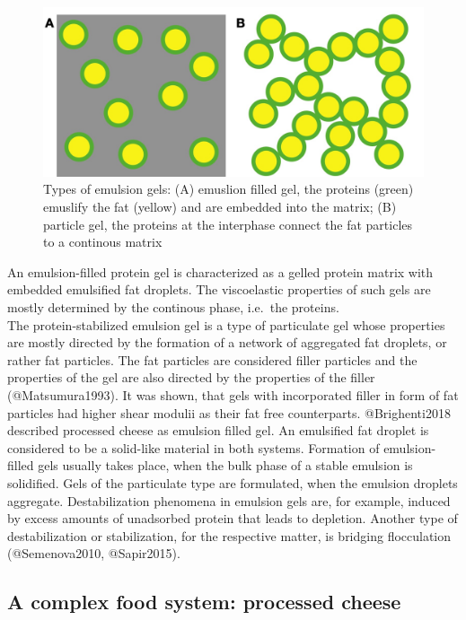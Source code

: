 \documentclass[
]{article}
\begin{document}
\begin{figure}
\includegraphics[width=0.5\linewidth]{images/EFG} \caption{Types of emulsion gels: (A) emuslion filled gel, the proteins (green) emuslify the fat (yellow) and are embedded into the matrix; (B) particle gel, the proteins at the interphase connect the fat particles to a continous matrix}\label{fig:unnamed-chunk-6}
\end{figure}

An emulsion-filled protein gel is characterized as a gelled protein
matrix with embedded emulsified fat droplets. The viscoelastic
properties of such gels are mostly determined by the continous phase,
i.e.~the proteins.\\
The protein-stabilized emulsion gel is a type of particulate gel whose
properties are mostly directed by the formation of a network of
aggregated fat droplets, or rather fat particles. The fat particles are
considered filler particles and the properties of the gel are also
directed by the properties of the filler (@Matsumura1993). It was shown,
that gels with incorporated filler in form of fat particles had higher
shear modulii as their fat free counterparts. @Brighenti2018 described
processed cheese as emulsion filled gel. An emulsified fat droplet is
considered to be a solid-like material in both systems. Formation of
emulsion-filled gels usually takes place, when the bulk phase of a
stable emulsion is solidified. Gels of the particulate type are
formulated, when the emulsion droplets aggregate. Destabilization
phenomena in emulsion gels are, for example, induced by excess amounts
of unadsorbed protein that leads to depletion. Another type of
destabilization or stabilization, for the respective matter, is bridging
flocculation (@Semenova2010, @Sapir2015).

\subsection{A complex food system: processed cheese}
\end{document}
